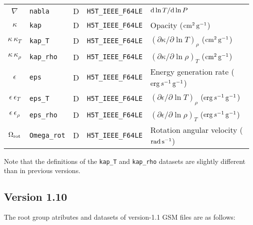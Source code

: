 \documentclass{article}
\newcommand{\diff}{\ensuremath{{\rm d}}}
\newcommand{\cm}{\ensuremath{{\rm cm}}}
\newcommand{\gram}{\ensuremath{{\rm g}}}
\newcommand{\second}{\ensuremath{{\rm s}}}
\newcommand{\erg}{\ensuremath{{\rm erg}}}
\begin{document}
\begin{table}[h!]
\begin{tabular}{|c|l|c|l|l|}
$\nabla$          & \texttt{nabla}        & D & \texttt{H5T\_IEEE\_F64LE} & $\diff \ln T/\diff \ln P$ \\
$\kappa$          & \texttt{kap}       & D &  \texttt{H5T\_IEEE\_F64LE} & Opacity ($\cm^{2}\,\gram^{-1}$) \\
$\kappa\,\kappa_{T}$      & \texttt{kap\_T}     & D &  \texttt{H5T\_IEEE\_F64LE} & $(\partial \kappa/\partial \ln T)_{\rho}$ ($\cm^{2}\,\gram^{-1}$) \\
$\kappa\,\kappa_{\rho}$   & \texttt{kap\_rho}   & D &  \texttt{H5T\_IEEE\_F64LE} & $(\partial \kappa/\partial \ln \rho)_{T}$ ($\cm^{2}\,\gram^{-1}$) \\
$\epsilon$        & \texttt{eps}      & D &  \texttt{H5T\_IEEE\_F64LE} & Energy generation rate ($\erg\,s^{-1}\,\gram^{-1}$) \\
$\epsilon\,\epsilon_{T}$    & \texttt{eps\_T}   & D &  \texttt{H5T\_IEEE\_F64LE} & $(\partial \epsilon/\partial \ln T)_{\rho}$ ($\erg\,s^{-1}\,\gram^{-1}$) \\
$\epsilon\,\epsilon_{\rho}$ & \texttt{eps\_rho} & D &  \texttt{H5T\_IEEE\_F64LE} & $(\partial \epsilon/\partial \ln \rho)_{T}$ ($\erg\,s^{-1}\,\gram^{-1}$) \\
$\Omega_{\rm rot}$ & \texttt{Omega\_rot}   & D & \texttt{H5T\_IEEE\_F64LE} & Rotation angular velocity (${\rm rad}\,\second^{-1}$) \\  \hline
\end{tabular}
\end{table}

Note that the definitions of the \texttt{kap\_T} and \texttt{kap\_rho} datasets are
slightly different than in previous versions.

\newpage

\subsection*{Version 1.10}

The root group atributes and datasets of version-1.1 GSM files are as follows:
\end{document}
